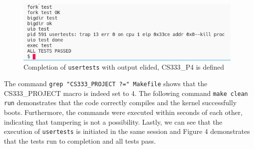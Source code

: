 \documentclass[11pt,letterpaper]{report}
\newcommand{\code}[1]{\colorbox{codegray}{\texttt{#1}}}
\begin{document}
{  \begin{figure}[h!]
	\centering
	\includegraphics[width=1\linewidth]{compilation2-usertests2.png}
	\caption[img]{Completion of \code{usertests} with output elided, CS333\_P4 is defined}
	\label{fig:P1compileP0-1}
  \end{figure}

  The command \code{grep "CS333\_PROJECT ?=" Makefile} shows that the CS333\_PROJECT macro
  is indeed set to 4. The following command \code{make clean run} demonstrates that the code
  correctly compiles and the kernel successfully boots. Furthermore, the commands were executed
  within seconds of each other, indicating that tampering is not a possibility. Lastly, we can
  see that the execution of \code{usertests} is initiated in the same session and Figure 4
  demonstrates that the tests run to completion and all tests pass. \\

\ifdefined \LF
} %
\fi
\end{document}
